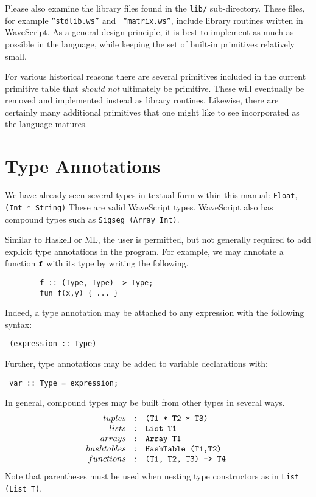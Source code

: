 \documentclass[twocolumn]{report}
\newenvironment{wscode}{\begin{center}\tt}{\end{center}}
\begin{document}
Please also examine the library files found in the {\tt lib/}
sub-directory.  These files, for example {\tt ``stdlib.ws''} and {\tt
  ``matrix.ws''}, include library routines written in WaveScript.  As
a general design principle, it is best to implement as much as
possible in the language, while keeping the set of built-in primitives
relatively small.

For various historical reasons there are several primitives included
in the current primitive table that {\em should not} ultimately be
primitive.  These will eventually be removed and implemented instead
as library routines.  Likewise, there are certainly many additional
primitives that one might like to see incorporated as the language matures.


\section{Type Annotations}

We have already seen several types in textual form within this manual:
{\tt Float}, {\tt (Int * String)} These are valid WaveScript types.
WaveScript also has compound types such as {\tt Sigseg (Array Int)}.

Similar to Haskell or ML, the user is permitted, but not generally
required to add explicit type annotations in the program.  For
example, we may annotate a function {$\tt f$} with its type by writing
the following.
%
\begin{verbatim}
        f :: (Type, Type) -> Type;
        fun f(x,y) { ... }
\end{verbatim}

Indeed, a type annotation may be attached to any expression with
the following syntax:
\begin{wscode}
(expression :: Type)
\end{wscode}

Further, type annotations may be added to variable declarations with:
\begin{wscode}
 var :: Type = expression;
\end{wscode}

In general, compound types may be built from other types in several
ways.  
\[
\begin{array}{rcl}
tuples           & : & $\tt (T1 * T2 * T3) $   \\
lists            & : & $\tt List T1 $ \\
arrays           & : & $\tt Array T1 $ \\
hashtables       & : & $\tt HashTable (T1,T2) $ \\
functions        & : & $\tt (T1, T2, T3) -> T4 $ \\
\end{array}
\]
Note that parentheses must be used when nesting type
constructors as in {\tt List (List T)}.
\end{document}
